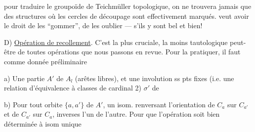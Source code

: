 pour  traduire le groupoïde de Teichmüller topologique, on ne trouvera jamais que des structures où les cercles de découpage sont effectivement marqués.
 veut avoir le droit de les ``gommer'', de les oublier  ---  s'ils y sont bel et bien!

D) \uline{Opération de recollement}. C'est la plus cruciale, la moins tautologique peut-être de toutes  opérations que nous passons en revue.
Pour la pratiquer, il faut comme donnée préliminaire

a) Une partie  $A'$ de $A_l$ (arêtes libres), et une involution ss pts fixes (i.e. une relation d'équivalence à classes de cardinal 2) $\sigma'$ de  

b) Pour  tout orbite  $\{a,a'\}$ de $A'$, un isom. renversant l'orientation de $C_a$ sur $C_{a'}$ et de $C_{a'}$ sur $C_a$, inverses l'un de l'autre.
Pour que l'opération soit bien déterminée à isom unique
